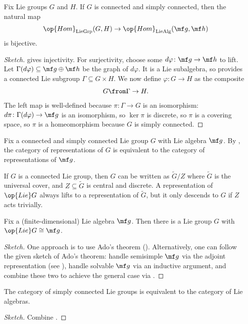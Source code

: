 \documentclass{article}
\begin{document}
\begin{theorem} \label{thm:lie-2}
	Fix Lie groups $G$ and $H$. If $G$ is connected and simply connected, then the natural map
	\[\op{Hom}_{\mathrm{LieGrp}}(G,H)\to\op{Hom}_{\mathrm{LieAlg}}(\mf g,\mf h)\]
	is bijective.
\end{theorem}
\begin{proof}[Sketch]
	 gives injectivity. For surjectivity, choose some $d\varphi\colon\mf g\to\mf h$ to lift. Let $\Gamma(d\varphi)\subseteq\mf g\oplus\mf h$ be the graph of $d\varphi$. It is a Lie subalgebra, so  provides a connected Lie subgroup $\Gamma\subseteq G\times H$. We now define $\varphi\colon G\to H$ as the composite
	\[G\from\Gamma\to H.\]
	The left map is well-defined because $\pi\colon\Gamma\to G$ is an isomorphism: $d\pi\colon\Gamma(d\varphi)\to\mf g$ is an isomorphism, so $\ker\pi$ is discrete, so $\pi$ is a covering space, so $\pi$ is a homeomorphism because $G$ is simply connected.
\end{proof}
\begin{example}
	Fix a connected and simply connected Lie group $G$ with Lie algebra $\mf g$. By , the category of representations of $G$ is equivalent to the category of representations of $\mf g$.
\end{example}
\begin{remark} \label{rem:descend-rep}
	If $G$ is a connected Lie group, then $G$ can be written as $\widetilde G/Z$ where $\widetilde G$ is the universal cover, and $Z\subseteq\widetilde G$ is central and discrete. A representation of $\op{Lie}G$ always lifts to a representation of $\widetilde G$, but it only descends to $G$ if $Z$ acts trivially.
\end{remark}
\begin{theorem} \label{thm:lie-3}
	Fix a (finite-dimensional) Lie algebra $\mf g$. Then there is a Lie group $G$ with $\op{Lie}G\cong\mf g$.
\end{theorem}
\begin{proof}[Sketch]
	One approach is to use Ado's theorem (). Alternatively, one can follow the given sketch of Ado's theorem: handle semisimple $\mf g$ via the adjoint representation (see ), handle solvable $\mf g$ via an inductive argument, and combine these two to achieve the general case via .
\end{proof}
\begin{corollary} \label{cor:lie-group-to-lie-alg}
	The category of simply connected Lie groups is equivalent to the category of Lie algebras.
\end{corollary}
\begin{proof}[Sketch]
	Combine .
\end{proof}
\end{document}
